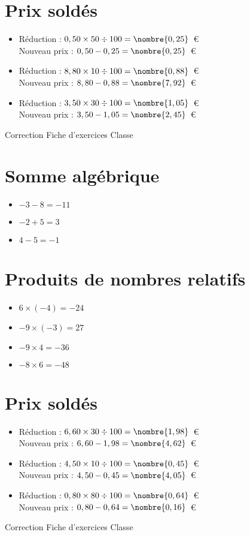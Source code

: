 \documentclass[a4paper,11pt,fleqn]{article}
\begin{document}
\section{Prix soldés}
\begin{itemize}

  \item Réduction : $0,50\times50\div100=\nombre{0,25}$~€\\
  Nouveau prix : $0,50-0,25=\nombre{0,25}$~€
  \item Réduction : $8,80\times10\div100=\nombre{0,88}$~€\\
  Nouveau prix : $8,80-0,88=\nombre{7,92}$~€
  \item Réduction : $3,50\times30\div100=\nombre{1,05}$~€\\
  Nouveau prix : $3,50-1,05=\nombre{2,45}$~€
\end{itemize}
\newpage
\setcounter{exo}{0}
\setcounter{section}{0}
{Correction} \hfill {\huge Fiche d'exercices } \hfill {Classe}

\section{Somme algébrique}
\begin{itemize}

  \item $-3 -8=-11$
  \item $-2 +5=3$
  \item $4 -5=-1$
\end{itemize}

\section{Produits de nombres relatifs}
\begin{itemize}

  \item $6\times(-4)=-24$
  \item $-9\times(-3)=27$
  \item $-9\times4=-36$
  \item $-8\times6=-48$
\end{itemize}

\section{Prix soldés}
\begin{itemize}

  \item Réduction : $6,60\times30\div100=\nombre{1,98}$~€\\
  Nouveau prix : $6,60-1,98=\nombre{4,62}$~€
  \item Réduction : $4,50\times10\div100=\nombre{0,45}$~€\\
  Nouveau prix : $4,50-0,45=\nombre{4,05}$~€
  \item Réduction : $0,80\times80\div100=\nombre{0,64}$~€\\
  Nouveau prix : $0,80-0,64=\nombre{0,16}$~€
\end{itemize}
\newpage
\setcounter{exo}{0}
\setcounter{section}{0}
{Correction} \hfill {\huge Fiche d'exercices } \hfill {Classe}
\end{document}
